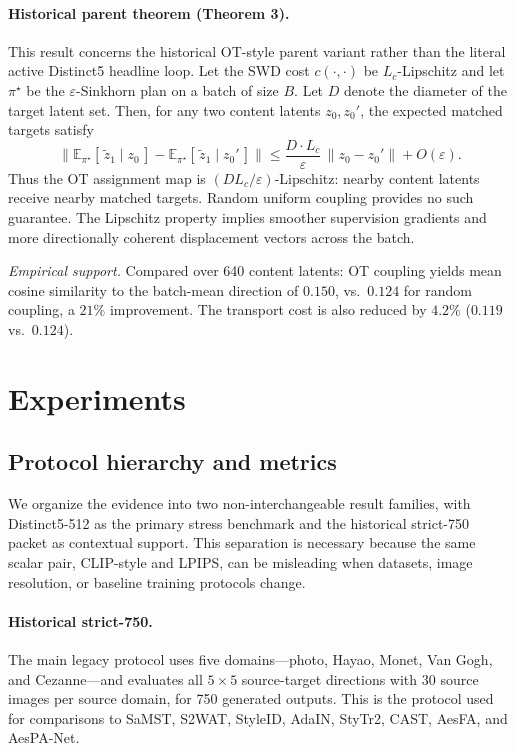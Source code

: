 \documentclass[letterpaper]{article}
\begin{document}
\paragraph{Historical parent theorem (Theorem 3).}
This result concerns the historical OT-style parent variant rather than the literal active Distinct5 headline loop.
Let the SWD cost $c(\cdot,\cdot)$ be $L_c$-Lipschitz and let
$\pi^\star$ be the $\varepsilon$-Sinkhorn plan on a batch of size $B$.
Let $D$ denote the diameter of the target latent set.
Then, for any two content latents $z_0,z_0'$, the expected
matched targets satisfy
\begin{equation}
\bigl\|\mathbb{E}_{\pi^\star}[\,\tilde z_1\mid z_0\,]
-\mathbb{E}_{\pi^\star}[\,\tilde z_1\mid z_0'\,]\bigr\|
\leq \frac{D\cdot L_c}{\varepsilon}\,\|z_0-z_0'\| + O(\varepsilon).
\label{eq:ot_lipschitz}
\end{equation}
Thus the OT assignment map is $(D L_c/\varepsilon)$-Lipschitz:
nearby content latents receive nearby matched targets.
Random uniform coupling provides no such guarantee.
The Lipschitz property implies smoother supervision gradients
and more directionally coherent displacement vectors across the batch.

\emph{Empirical support.}
Compared over 640 content latents:
OT coupling yields mean cosine similarity to the batch-mean
direction of $0.150$, vs.\ $0.124$ for random coupling,
a $21\%$ improvement.
The transport cost is also reduced by $4.2\%$ ($0.119$ vs.\ $0.124$).

\section{Experiments}
\subsection{Protocol hierarchy and metrics}
We organize the evidence into two non-interchangeable result families, with Distinct5-512 as the primary stress benchmark and the historical strict-750 packet as contextual support. This separation is necessary because the same scalar pair, CLIP-style and LPIPS, can be misleading when datasets, image resolution, or baseline training protocols change.

\paragraph{Historical strict-750.}
The main legacy protocol uses five domains---photo, Hayao, Monet, Van Gogh, and Cezanne---and evaluates all $5\times5$ source-target directions with 30 source images per source domain, for 750 generated outputs. This is the protocol used for comparisons to SaMST, S2WAT, StyleID, AdaIN, StyTr2, CAST, AesFA, and AesPA-Net.
\end{document}
